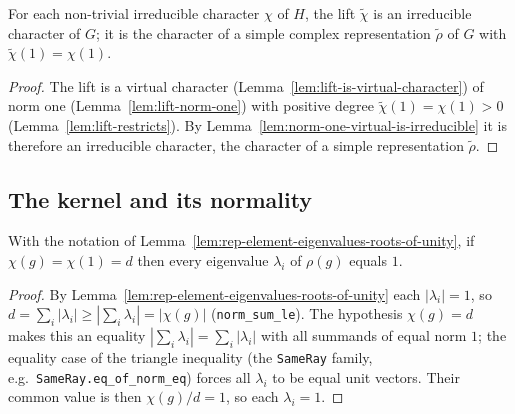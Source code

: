\begin{lemma}
    \label{lem:lift-is-irreducible}
    For each non-trivial irreducible character $\chi$ of $H$, the lift
    $\widetilde{\chi}$ is an irreducible character of $G$; it is the character of a
    simple complex representation $\widetilde{\rho}$ of $G$ with
    $\widetilde{\chi}(1) = \chi(1)$.
\end{lemma}
\begin{proof}
    The lift is a virtual character (Lemma~\ref{lem:lift-is-virtual-character}) of
    norm one (Lemma~\ref{lem:lift-norm-one}) with positive degree
    $\widetilde{\chi}(1) = \chi(1) > 0$ (Lemma~\ref{lem:lift-restricts}). By
    Lemma~\ref{lem:norm-one-virtual-is-irreducible} it is therefore an irreducible
    character, the character of a simple representation $\widetilde{\rho}$.
\end{proof}

\subsection{The kernel and its normality}

\begin{lemma}
    \label{lem:char-eq-degree-implies-eigenvalues-one}
    \leanok
    With the notation of
    Lemma~\ref{lem:rep-element-eigenvalues-roots-of-unity}, if
    $\chi(g) = \chi(1) = d$ then every eigenvalue $\lambda_i$ of $\rho(g)$ equals
    $1$.
\end{lemma}
\begin{proof}
    By Lemma~\ref{lem:rep-element-eigenvalues-roots-of-unity} each
    $|\lambda_i| = 1$, so $d = \sum_i |\lambda_i| \ge |\sum_i \lambda_i| =
    |\chi(g)|$ (\texttt{norm\_sum\_le}). The hypothesis $\chi(g) = d$ makes this an
    equality $|\sum_i \lambda_i| = \sum_i |\lambda_i|$ with all summands of equal
    norm $1$; the equality case of the triangle inequality (the \texttt{SameRay}
    family, e.g.\ \texttt{SameRay.eq\_of\_norm\_eq}) forces all $\lambda_i$ to be
    equal unit vectors. Their common value is then $\chi(g)/d = 1$, so each
    $\lambda_i = 1$.
\end{proof}

